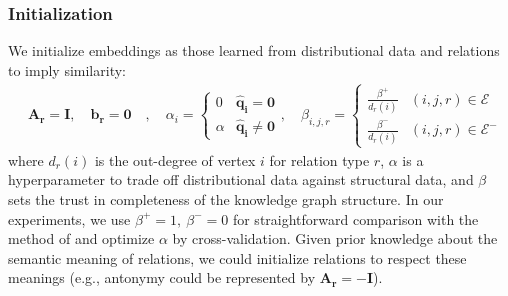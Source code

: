 \documentclass[11pt, a4paper]{article}
\begin{document}
\subsubsection*{Initialization}
We initialize embeddings as those learned from distributional data and relations to imply similarity:
\begin{align*}
    &\boldsymbol{A_r} = \boldsymbol{I},\quad \boldsymbol{b_r} = \boldsymbol{0} \quad,
       \quad \alpha_i = \begin{cases}
        0 & \boldsymbol{\hat{q}_i} = \boldsymbol{0} \\
        \alpha & \boldsymbol{\hat{q}_i} \neq \boldsymbol{0} \end{cases},
        \quad \beta_{i,j,r} = \begin{cases}
        \frac{\beta^+}{d_r(i)} & (i,j,r) \in \mathcal{E}\\
        \frac{\beta^-}{d_r(i)} & (i,j,r) \in \mathcal{E}^- \end{cases}%
\end{align*}
where $d_r(i)$ is the out-degree of vertex $i$ for relation type $r$, $\alpha$ is a hyperparameter to trade off distributional data against structural data, and $\beta$ sets the trust in completeness of the knowledge graph structure. In our experiments, we use $\beta^+=1,~\beta^-=0$ for straightforward comparison with the method of  and optimize $\alpha$ by cross-validation. Given prior knowledge about the semantic meaning of relations, we could initialize relations to respect these meanings (e.g., antonymy could be represented by $\boldsymbol{A_r} = -\boldsymbol{I}$).
\end{document}
